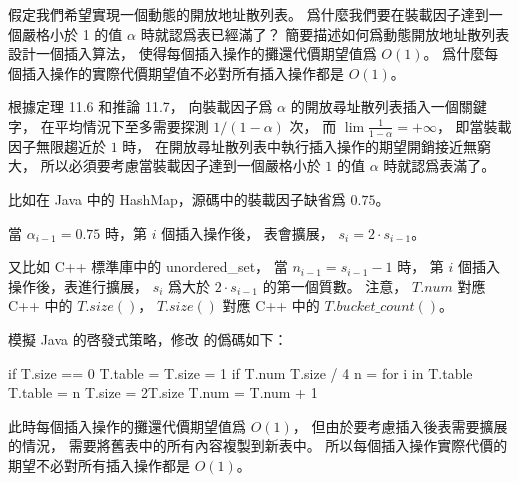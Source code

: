 \startEXERCISE
假定我們希望實現一個動態的開放地址散列表。
爲什麼我們要在裝載因子達到一個嚴格小於 1 的值 $\alpha$ 時就認爲表已經滿了？
簡要描述如何爲動態開放地址散列表設計一個插入算法，
使得每個插入操作的攤還代價期望值爲 $O(1)$。
爲什麼每個插入操作的實際代價期望值不必對所有插入操作都是 $O(1)$。
\stopEXERCISE

\startANSWER
根據定理 11.6 和推論 11.7，
向裝載因子爲 $\alpha$ 的開放尋址散列表插入一個關鍵字，
在平均情況下至多需要探測 $1/(1-\alpha)$ 次，
而 $\lim\frac{1}{1-\alpha}=+\infty$，
即當裝載因子無限趨近於 $1$ 時，
在開放尋址散列表中執行插入操作的期望開銷接近無窮大，
所以必須要考慮當裝載因子達到一個嚴格小於 $1$ 的值 $\alpha$ 時就認爲表滿了。

比如在 Java 中的 HashMap，源碼中的裝載因子缺省爲 $0.75$。

當 $\alpha_{i-1}=0.75$ 時，第 $i$ 個插入操作後，
表會擴展， $s_i = 2\cdot s_{i-1}$。

又比如 C++ 標準庫中的 unordered_set，
當 $n_{i-1}=s_{i-1}-1$ 時，
第 $i$ 個插入操作後，表進行擴展，
 $s_i$ 爲大於 $2\cdot s_{i-1}$ 的第一個質數。
注意， $T.num$ 對應 C++ 中的 $T.size()$，
 $T.size()$ 對應 C++ 中的 $T.bucket\_count()$。

模擬 Java 的啓發式策略，修改  的僞碼如下：

\startCLRSCODE
if T.size == 0
	T.table = 
	T.size = 1
if T.num \ge T.size  / 4
	n = 
	for i in T.table
	T.table = n
	T.size = 2\cdot T.size
T.num = T.num + 1
\stopCLRSCODE

此時每個插入操作的攤還代價期望值爲 $O(1)$，
但由於要考慮插入後表需要擴展的情況，
需要將舊表中的所有內容複製到新表中。
所以每個插入操作實際代價的期望不必對所有插入操作都是 $O(1)$。
\stopANSWER
